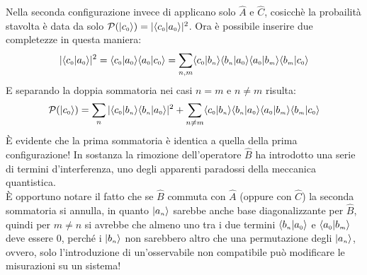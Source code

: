 Nella seconda configurazione invece di applicano solo $\hat A$ e $\hat C$, cosicchè la probailità stavolta è data da solo $\P(\Ket {c_{\scriptscriptstyle 0}}) = \abs{\braket{c_{\scriptscriptstyle 0}}{a_{\scriptscriptstyle 0}}}^2$. Ora è possibile inserire due completezze in questa maniera:
\[
	\abs{\braket{c_{\scriptscriptstyle 0}}{a_{\scriptscriptstyle 0}}}^2 = \braket{c_{\scriptscriptstyle 0}}{a_{\scriptscriptstyle 0}}\braket{a_{\scriptscriptstyle 0}}{c_{\scriptscriptstyle 0}} = \sum_{n,m}\braket{c_{\scriptscriptstyle 0}}{b_{\scriptscriptstyle n}}\braket{b_{\scriptscriptstyle n}}{a_{\scriptscriptstyle 0}}\braket{a_{\scriptscriptstyle 0}}{b_{\scriptscriptstyle m}}\braket{b_{\scriptscriptstyle m}}{c_{\scriptscriptstyle 0}}
\]
E separando la doppia sommatoria nei casi $n=m$ e $n\neq m$ risulta:
\[
	\P(\Ket {c_{\scriptscriptstyle 0}}) = \sum_{n}\abs{\braket{c_{\scriptscriptstyle 0}}{b_{\scriptscriptstyle n}}\braket{b_{\scriptscriptstyle n}}{a_{\scriptscriptstyle 0}}}^2 + \sum_{n\neq m}\braket{c_{\scriptscriptstyle 0}}{b_{\scriptscriptstyle n}}\braket{b_{\scriptscriptstyle n}}{a_{\scriptscriptstyle 0}}\braket{a_{\scriptscriptstyle 0}}{b_{\scriptscriptstyle m}}\braket{b_{\scriptscriptstyle m}}{c_{\scriptscriptstyle 0}}
\]
È evidente che la prima sommatoria è identica a quella della prima configurazione! In sostanza la rimozione dell'operatore $\hat B$ ha introdotto una serie di termini d'interferenza, uno degli apparenti paradossi della meccanica quantistica.\\
È opportuno notare il fatto che se $\hat B$ commuta con $\hat A$ (oppure con $\hat C$) la seconda sommatoria si annulla, in quanto $\Ket {a_{\scriptscriptstyle n}}$ sarebbe anche base diagonalizzante per $\hat B$, quindi per $m \neq n$ si avrebbe che almeno uno tra i due termini $\braket{b_{\scriptscriptstyle n}}{a_{\scriptscriptstyle 0}}$ e $\braket{a_{\scriptscriptstyle 0}}{b_{\scriptscriptstyle m}}$ deve essere 0, perché i $\Ket {b_{\scriptscriptstyle n}}$ non sarebbero altro che una permutazione degli $\Ket {a_{\scriptscriptstyle n}}$, ovvero, solo l'introduzione di un'osservabile non compatibile può modificare le misurazioni su un sistema!

